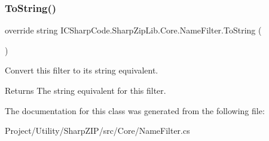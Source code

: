 \subsubsection{\texorpdfstring{To\+String()}{ToString()}}
{\footnotesize\ttfamily override string I\+C\+Sharp\+Code.\+Sharp\+Zip\+Lib.\+Core.\+Name\+Filter.\+To\+String (\begin{DoxyParamCaption}{ }\end{DoxyParamCaption})\hspace{0.3cm}{\ttfamily [inline]}}



Convert this filter to its string equivalent. 

\begin{DoxyReturn}{Returns}
The string equivalent for this filter.
\end{DoxyReturn}


The documentation for this class was generated from the following file\+:\begin{DoxyCompactItemize}
\item 
Project/\+Utility/\+Sharp\+Z\+I\+P/src/\+Core/Name\+Filter.\+cs\end{DoxyCompactItemize}
